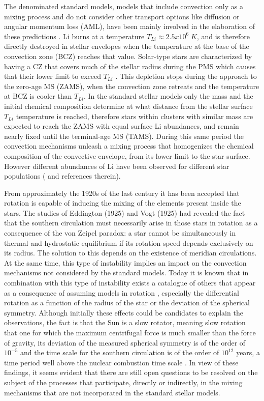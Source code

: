 \documentclass[fleqn,usenatbib]{mnras}
\begin{document}
The denominated standard models, models that include convection only as a mixing process and do not consider other transport options like diffusion or angular momentum loss (AML), have been mainly involved in the elaboration of these predictions \citep{Sestito2005}. Li burns at a temperature $T_{Li} \approx 2.5 x 10^6\; K$, and is therefore directly destroyed in stellar envelopes when the temperature at the base of the convection zone (BCZ) reaches that value. Solar-type stars are characterized by having a CZ that covers much of the stellar radius during the PMS which causes that their lower limit to exceed $T_{Li}$ \citep{Iben1965}. This depletion stops during the approach to the zero-age MS (ZAMS), when the convection zone retreats and the temperature at BCZ is cooler than $T_{Li}$. In the standard stellar models only the mass and the initial chemical composition determine at what distance from the stellar surface $T_{Li}$ temperature is reached, therefore stars within clusters with similar mass are expected to reach the ZAMS with equal surface Li abundances, and remain nearly fixed until the terminal-age MS (TAMS). During this same period the convection mechanisms unleash a mixing process that homogenizes the chemical composition of the convective envelope, from its lower limit to the star surface. However different abundances of Li have been observed for different star populations (\citet{Somers2014} and references therein).\par

From approximately the 1920s of the last century it has been accepted that rotation is capable of inducing the mixing of the elements present inside the stars. The studies of Eddington (1925) and Vogt (1925) had revealed the fact that the southern circulation must necessarily arise in those stars in rotation as a consequence of the von Zeipel paradox: a star cannot be simultaneously in thermal and hydrostatic equilibrium if its rotation speed depends exclusively on its radius. The solution to this depends on the existence of meridian circulations. At the same time, this type of instability implies an impact on the convection mechanisms not considered by the standard models. Today it is known that in combination with this type of instability exists a catalogue of others that appear as a consequence of assuming models in rotation \citep{Maeder2003a}, especially the differential rotation as a function of the radius of the star or the deviation of the spherical symmetry. Although initially these effects could be candidates to explain the observations, the fact is that the Sun is a slow rotator, meaning slow rotation that one for which the maximum centrifugal force is much smaller than the force of gravity, its deviation of the measured spherical symmetry is of the order of $10^{-5}$ and the time scale for the southern circulation is of the order of $10^{12}$ years, a time period well above the nuclear combustion time scale \citep{Pinsonneault1997}. In view of these findings, it seems evident that there are still open questions to be resolved on the subject of the processes that participate, directly or indirectly, in the mixing mechanisms that are not incorporated in the standard stellar models.\par
\end{document}
